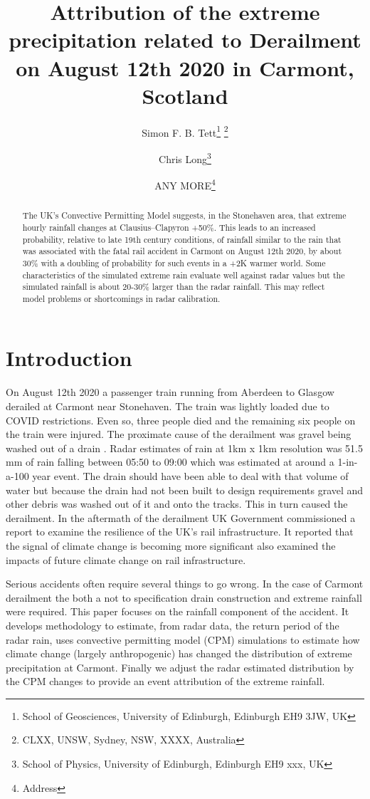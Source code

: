\documentclass[11pt,a4paper]{article}
\title{Attribution of the  extreme precipitation related to Derailment  on August 12th 2020 in Carmont, Scotland}
\author{Simon F. B. Tett\thanks{School of Geosciences, University of Edinburgh, Edinburgh EH9 3JW, UK} \thanks{CLXX, UNSW, Sydney, NSW, XXXX, Australia}
	\and 
Chris Long\thanks{School of Physics, University of Edinburgh, Edinburgh EH9 xxx, UK}
\and 
ANY MORE\thanks{Address}}
\begin{document}
	
\maketitle

\graphicspath{{../figures/}}


\begin{abstract}

	The UK's Convective Permitting Model suggests, in the Stonehaven area, that extreme hourly rainfall changes at Clausius–Clapyron +50\%. This leads to an increased probability, relative to late 19th century conditions,  of rainfall similar to the rain that was associated with the fatal rail accident in Carmont on August 12th 2020, by about 30\% with a doubling of probability for such events in a +2K warmer world. Some characteristics of the simulated extreme rain evaluate well against radar values but the  simulated rainfall is about 20-30\% larger than the radar rainfall. This may reflect model problems or shortcomings in  radar  calibration. 
\end{abstract}



\section{Introduction}
\label{sect:Intro}

On August 12th 2020 a passenger train running from Aberdeen to Glasgow derailed at Carmont near Stonehaven. The train was lightly loaded due to COVID restrictions. Even so,  three people died and the remaining six people on the train  were injured. The proximate cause of the derailment was gravel being washed out of a drain \parencite{carmontReport2024}. Radar estimates of  rain at 1km x 1km resolution was 51.5 mm of rain falling between 05:50 to 09:00 which was estimated at around a 1-in-a-100 year event. The drain should have been able to deal with that volume of water but because the drain had not been built to design requirements gravel and other debris was washed out of it and onto the tracks. This in turn caused the derailment. In the aftermath of the derailment UK Government commissioned a report to examine the resilience of the UK's rail infrastructure\parencite{NR_DfT_2021}. It reported that the signal of climate change is becoming more significant  also examined the impacts of future climate change  on rail infrastructure.


 Serious accidents often require several things to go wrong. In the case of Carmont derailment  the both a not to specification drain construction and extreme rainfall were required. This paper focuses on the rainfall component of the accident. It develops methodology to estimate, from radar data, the return period of the radar rain, uses convective permitting model (CPM) simulations to estimate how climate change (largely anthropogenic) has changed the distribution of extreme precipitation at Carmont. Finally we adjust the radar estimated distribution by the CPM changes to provide an event attribution of the extreme rainfall. 
\end{document}
